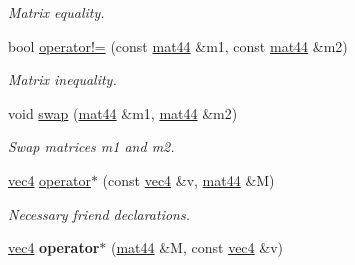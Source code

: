 \begin{DoxyCompactItemize}
\begin{DoxyCompactList}\small\item\em \-Matrix equality. \end{DoxyCompactList}\item 
\hypertarget{classutil_1_1math_1_1mat44_aed2f870b4e0426990f6fe2ede755afe7}{bool \hyperlink{classutil_1_1math_1_1mat44_aed2f870b4e0426990f6fe2ede755afe7}{operator!=} (const \hyperlink{classutil_1_1math_1_1mat44}{mat44} \&m1, const \hyperlink{classutil_1_1math_1_1mat44}{mat44} \&m2)}\label{classutil_1_1math_1_1mat44_aed2f870b4e0426990f6fe2ede755afe7}

\begin{DoxyCompactList}\small\item\em \-Matrix inequality. \end{DoxyCompactList}\item 
\hypertarget{classutil_1_1math_1_1mat44_a726fe0a50269759ca1e870c5a0ff6b25}{void \hyperlink{classutil_1_1math_1_1mat44_a726fe0a50269759ca1e870c5a0ff6b25}{swap} (\hyperlink{classutil_1_1math_1_1mat44}{mat44} \&m1, \hyperlink{classutil_1_1math_1_1mat44}{mat44} \&m2)}\label{classutil_1_1math_1_1mat44_a726fe0a50269759ca1e870c5a0ff6b25}

\begin{DoxyCompactList}\small\item\em \-Swap matrices m1 and m2. \end{DoxyCompactList}\end{DoxyCompactItemize}
{\bf }\par
\begin{DoxyCompactItemize}
\item 
\hypertarget{classutil_1_1math_1_1mat44_a94511f24a41c2c96d95c7f65929dc07a}{\hyperlink{classutil_1_1math_1_1vec4}{vec4} \hyperlink{classutil_1_1math_1_1mat44_a94511f24a41c2c96d95c7f65929dc07a}{operator$\ast$} (const \hyperlink{classutil_1_1math_1_1vec4}{vec4} \&v, \hyperlink{classutil_1_1math_1_1mat44}{mat44} \&\-M)}\label{classutil_1_1math_1_1mat44_a94511f24a41c2c96d95c7f65929dc07a}

\begin{DoxyCompactList}\small\item\em \-Necessary friend declarations. \end{DoxyCompactList}\item 
\hypertarget{classutil_1_1math_1_1mat44_ae4c0f87a39f90b6d0536a63483ade070}{\hyperlink{classutil_1_1math_1_1vec4}{vec4} {\bfseries operator$\ast$} (\hyperlink{classutil_1_1math_1_1mat44}{mat44} \&\-M, const \hyperlink{classutil_1_1math_1_1vec4}{vec4} \&v)}\label{classutil_1_1math_1_1mat44_ae4c0f87a39f90b6d0536a63483ade070}

\end{DoxyCompactItemize}



